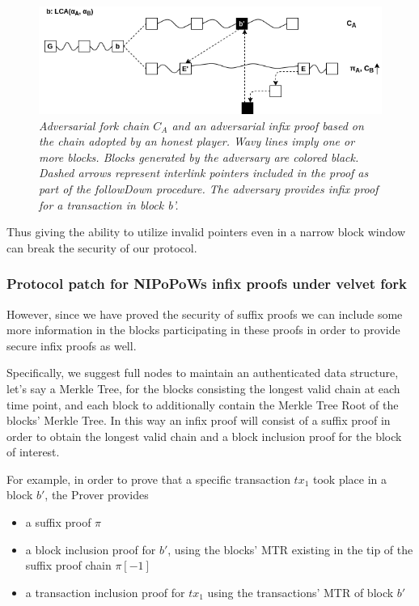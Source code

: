 \documentclass[11pt,a4paper]{article}
\begin{document}
\begin{figure}[h!]
	\begin{center}
		\includegraphics[scale=0.52]{figures/infix_attack.png}
	\end{center}
	\caption{\textit{Adversarial fork chain $C_A$ and an adversarial infix proof based on the chain adopted by an honest player. Wavy lines imply one or more blocks. Blocks generated by the adversary are colored black. Dashed arrows represent interlink pointers included in the proof as part of the \textit{followDown} procedure. The adversary provides infix proof for a transaction in block b'. }}
	\label{fig:infix_attack}
\end{figure}

Thus giving the ability to utilize invalid pointers even in a narrow block window can break the security of our protocol. 

\subsubsection*{Protocol patch for NIPoPoWs infix proofs under velvet fork}
However, since we have proved the security of suffix proofs we can include some more information in the blocks participating in these proofs in order to provide secure infix proofs as well.
 
Specifically, we suggest full nodes to maintain an authenticated data structure, let's say a Merkle Tree, for the blocks consisting the longest valid chain at each time point, and each block to additionally contain the Merkle Tree Root of  the blocks' Merkle Tree. In this way an infix proof will consist of a suffix proof in order to obtain the longest valid chain and a block inclusion proof for the block of interest. 

For example, in order to prove that a specific transaction $tx_1$ took place in a block $b'$, the Prover provides
\begin{itemize}
\item a suffix proof $\pi$
\item a block inclusion proof for $b'$, using the blocks' MTR existing in the tip of the suffix proof chain $\pi[-1]$
\item a transaction inclusion proof for $tx_1$ using the transactions' MTR of block $b'$
\end{itemize}
\end{document}
